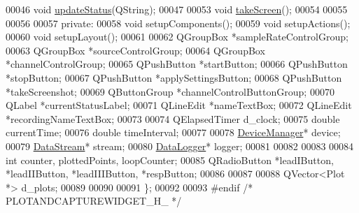 \begin{DoxyCode}
00046     \textcolor{keywordtype}{void} \hyperlink{classPlotAndCaptureWidget_a769ecd243154ae9c4ecae9bd4fcbccdb}{updateStatus}(QString);
00047 
00053     \textcolor{keywordtype}{void} \hyperlink{classPlotAndCaptureWidget_a77ecf5a130215ce0246b8817e44081f7}{takeScreen}();
00054 
00055 
00056 
00057 \textcolor{keyword}{private}:
00058     \textcolor{keywordtype}{void} setupComponents();
00059     \textcolor{keywordtype}{void} setupActions();
00060     \textcolor{keywordtype}{void} setupLayout();
00061 
00062     QGroupBox *sampleRateControlGroup;
00063     QGroupBox *sourceControlGroup;
00064     QGroupBox *channelControlGroup;
00065     QPushButton *startButton;
00066     QPushButton *stopButton;
00067     QPushButton *applySettingsButton;
00068     QPushButton *takeScreenshot;
00069     QButtonGroup *channelControlButtonGroup;
00070     QLabel *currentStatusLabel;
00071     QLineEdit *nameTextBox;
00072     QLineEdit *recordingNameTextBox;
00073 
00074      QElapsedTimer d\_clock;
00075         \textcolor{keywordtype}{double} currentTime;
00076         \textcolor{keywordtype}{double} timeInterval;
00077 
00078         \hyperlink{classDeviceManager}{DeviceManager}* device;
00079         \hyperlink{classDataStream}{DataStream}* stream;
00080     \hyperlink{classDataLogger}{DataLogger}* logger;
00081 
00082 
00083 
00084     \textcolor{keywordtype}{int} counter, plottedPoints, loopCounter;
00085     QRadioButton *leadIButton, *leadIIButton, *leadIIIButton, *respButton;
00086 
00087 
00088     QVector<Plot *> d\_plots;
00089 
00090 
00091 \};
00092 
00093 \textcolor{preprocessor}{#endif }\textcolor{comment}{/* PLOTANDCAPTUREWIDGET\_H\_ */}\textcolor{preprocessor}{}
\end{DoxyCode}
